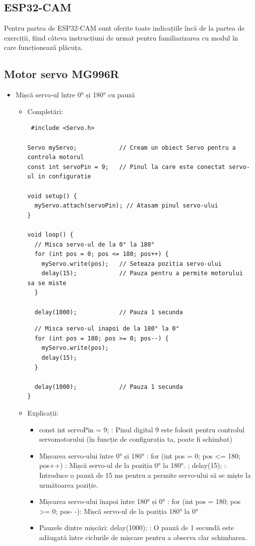 \documentclass{report}
\begin{document}
\subsection{ESP32-CAM} 
Pentru partea de ESP32-CAM sunt oferite toate indicațiile încă de la partea de exerciții, fiind câteva instrucțiuni de urmat pentru familiarizarea cu modul în care funcționează plăcuța.

\subsection{Motor servo MG996R}
\begin{itemize}
    \item Mișcă servo-ul între 0° și 180° cu pauză
    \begin{itemize}
        \item Completări:
            \begin{lstlisting}
 #include <Servo.h>

Servo myServo;            // Cream un obiect Servo pentru a controla motorul
const int servoPin = 9;   // Pinul la care este conectat servo-ul in configuratie

void setup() {
  myServo.attach(servoPin); // Atasam pinul servo-ului
}

void loop() {
  // Misca servo-ul de la 0° la 180°
  for (int pos = 0; pos <= 180; pos++) {
    myServo.write(pos);   // Seteaza pozitia servo-ului
    delay(15);            // Pauza pentru a permite motorului sa se miste
  }

  delay(1000);            // Pauza 1 secunda
   \end{lstlisting}
   \newpage
   \vspace*{1cm}
   \begin{lstlisting}
  // Misca servo-ul inapoi de la 180° la 0°
  for (int pos = 180; pos >= 0; pos--) {
    myServo.write(pos);
    delay(15);
  }

  delay(1000);            // Pauza 1 secunda
}

            \end{lstlisting}
        \item Explicații:
            \begin{itemize}
                \item const int servoPin = 9; : Pinul digital 9 este folosit pentru controlul servomotorului (în funcție de configurația ta, poate fi schimbat)
                \item Mișcarea servo-ului între 0° și 180° : for (int pos = 0; pos <= 180; pos++) : Mișcă servo-ul de la poziția 0° la 180°. ; delay(15); : Introduce o pauză de 15 ms pentru a permite servo-ului să se miște la următoarea poziție.
                \item Mișcarea servo-ului înapoi între 180° și 0° : for (int pos = 180; pos >= 0; pos- -): Mișcă servo-ul de la poziția 180° la 0°
                \item Pauzele dintre mișcări: delay(1000); : O pauză de 1 secundă este adăugată între ciclurile de mișcare pentru a observa clar schimbarea.
            \end{itemize}
            

\end{itemize}
\end{itemize}
\end{document}
